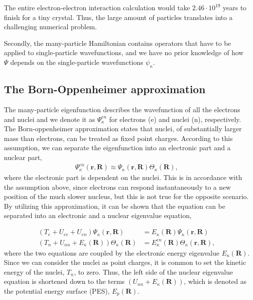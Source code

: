 The entire electron-electron interaction calculation would take $2.46 \cdot 10^{19}$ years to finish for a tiny crystal. Thus, the large amount of particles translates into a challenging numerical problem.


Secondly, the many-particle Hamiltonian contains operators that have to be applied to single-particle wavefunctions, and we have no prior knowledge of how $\Psi$ depends on the single-particle wavefunctions $\psi_\kappa$.


\subsection{The Born-Oppenheimer approximation}
The many-particle eigenfunction describes the wavefunction of all the electrons and nuclei and we denote it as $\Psi_{\kappa}^{en}$ for electrons (e) and nuclei (n), respectively. The Born-oppenheimer approximation states that nuclei, of substantially larger mass than electrons, can be treated as fixed point charges. According to this assumption, we can separate the eigenfunction into an electronic part and a nuclear part,
\begin{align}
  \Psi_\kappa^{en}(\boldsymbol{r}, \boldsymbol{R}) \approx \Psi_{\kappa}(\boldsymbol{r}, \boldsymbol{R})\Theta_{\kappa}(\boldsymbol{R}),
\end{align}
where the electronic part is dependent on the nuclei. This is in accordance with the assumption above, since electrons can respond instantaneously to a new position of the much slower nucleus, but this is not true for the opposite scenario. By utilizing this approximation, it can be shown that the equation can be separated into an electronic and a nuclear eigenvalue equation,

\begin{align}
      \left( T_e + U_{ee} + U_{en} \right) \Psi_\kappa (\boldsymbol{r},\boldsymbol{R}) &= E_{\kappa}(\boldsymbol{R})\Psi_\kappa(\boldsymbol{r},\boldsymbol{R})\\
      \left(T_n + U_{nn} + E_\kappa (\boldsymbol{R}) \right) \Theta_\kappa(\boldsymbol{R}) &= E_{\kappa}^{en}(\boldsymbol{R})\Theta_\kappa(\boldsymbol{r},\boldsymbol{R}),
\end{align}
where the two equations are coupled by the electronic energy eigenvalue $E_{\kappa}(\boldsymbol{R})$. Since we can consider the nuclei as point charges, it is common to set the kinetic energy of the nuclei, $T_n$, to zero. Thus, the left side of the nuclear eigenvalue equation is shortened down to the terms $\left(U_{nn} + E_\kappa (\boldsymbol{R}) \right)$, which is denoted as the potential energy surface (PES), $E_p(\boldsymbol{R})$.


